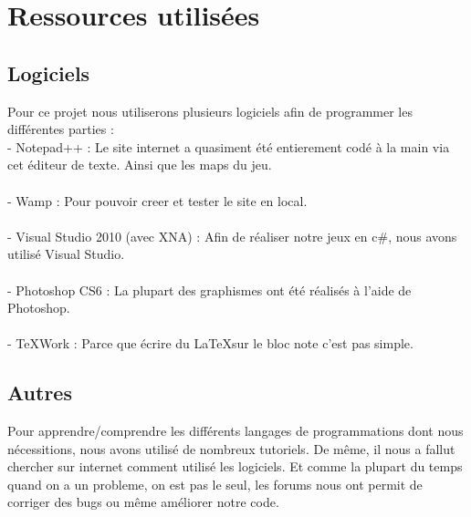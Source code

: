\documentclass [11pt]{report}
\begin{document}
\chapter {Ressources utilisées}
	\section {Logiciels}

	Pour ce projet nous utiliserons plusieurs logiciels afin de programmer les différentes parties :\\

	- Notepad++ : Le site internet a quasiment été entierement codé à la main via cet éditeur de texte. Ainsi que les maps du jeu.\\\\\indent
	- Wamp : Pour pouvoir creer et tester le site en local.\\\\\indent
	- Visual Studio 2010 (avec XNA) : Afin de réaliser notre jeux en c\#, nous avons utilisé Visual Studio.\\\\\indent
	- Photoshop CS6 : La plupart des graphismes ont été réalisés à l'aide de Photoshop.\\\\\indent
	- TeXWork : Parce que écrire du \LaTeX sur le bloc note c'est pas simple.\\\vspace{10mm}



	\section {Autres}

	Pour apprendre/comprendre les différents langages de programmations dont nous nécessitions, nous avons utilisé de nombreux tutoriels. De même, il nous a fallut chercher sur internet comment utilisé les logiciels. Et comme la plupart du temps quand on a un probleme, on est pas le seul, les forums nous ont permit de corriger des bugs ou même améliorer notre code.
\end{document}

